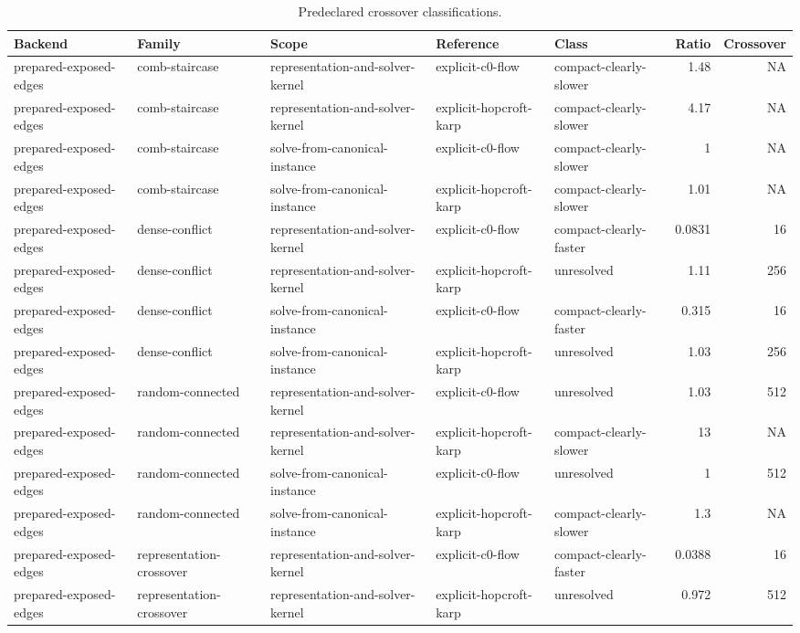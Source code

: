 \begin{table}[t]
\caption{Predeclared crossover classifications.}
\label{tab:kernel-crossover}
\begin{tabular}{lllllrr}
\toprule
Backend & Family & Scope & Reference & Class & Ratio & Crossover \\
\midrule
prepared-exposed-edges & comb-staircase & representation-and-solver-kernel & explicit-c0-flow & compact-clearly-slower & 1.48 & NA \\
prepared-exposed-edges & comb-staircase & representation-and-solver-kernel & explicit-hopcroft-karp & compact-clearly-slower & 4.17 & NA \\
prepared-exposed-edges & comb-staircase & solve-from-canonical-instance & explicit-c0-flow & compact-clearly-slower & 1 & NA \\
prepared-exposed-edges & comb-staircase & solve-from-canonical-instance & explicit-hopcroft-karp & compact-clearly-slower & 1.01 & NA \\
prepared-exposed-edges & dense-conflict & representation-and-solver-kernel & explicit-c0-flow & compact-clearly-faster & 0.0831 & 16 \\
prepared-exposed-edges & dense-conflict & representation-and-solver-kernel & explicit-hopcroft-karp & unresolved & 1.11 & 256 \\
prepared-exposed-edges & dense-conflict & solve-from-canonical-instance & explicit-c0-flow & compact-clearly-faster & 0.315 & 16 \\
prepared-exposed-edges & dense-conflict & solve-from-canonical-instance & explicit-hopcroft-karp & unresolved & 1.03 & 256 \\
prepared-exposed-edges & random-connected & representation-and-solver-kernel & explicit-c0-flow & unresolved & 1.03 & 512 \\
prepared-exposed-edges & random-connected & representation-and-solver-kernel & explicit-hopcroft-karp & compact-clearly-slower & 13 & NA \\
prepared-exposed-edges & random-connected & solve-from-canonical-instance & explicit-c0-flow & unresolved & 1 & 512 \\
prepared-exposed-edges & random-connected & solve-from-canonical-instance & explicit-hopcroft-karp & compact-clearly-slower & 1.3 & NA \\
prepared-exposed-edges & representation-crossover & representation-and-solver-kernel & explicit-c0-flow & compact-clearly-faster & 0.0388 & 16 \\
prepared-exposed-edges & representation-crossover & representation-and-solver-kernel & explicit-hopcroft-karp & unresolved & 0.972 & 512 \\

\end{tabular}
\end{table}
